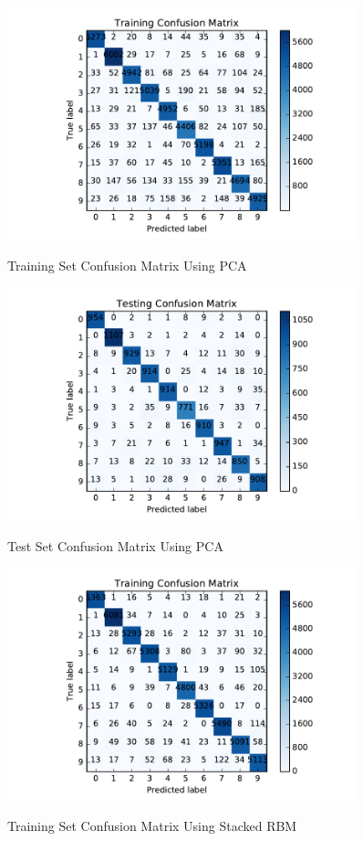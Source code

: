 \begin{figure}[H]
\centering
\includegraphics[width=0.9\textwidth]{./figures/train_pca.pdf}\
\caption{\label{fig:train_pca} Training Set Confusion Matrix Using PCA}
\end{figure}

\begin{figure}[H]
\centering
\includegraphics[width=0.9\textwidth]{./figures/test_pca.pdf}\
\caption{\label{fig:test_pca} Test Set Confusion Matrix Using PCA}
\end{figure}


\begin{figure}[H]
\centering
\includegraphics[width=0.9\textwidth]{./figures/train_stacking.pdf}\
\caption{\label{fig:train_stack} Training Set Confusion Matrix Using Stacked RBM}
\end{figure}

